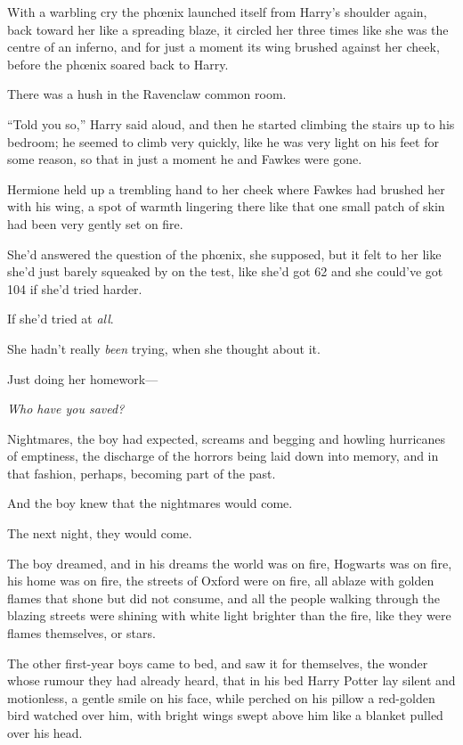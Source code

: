 With a warbling cry the phœnix launched itself from Harry’s shoulder again, back toward her like a spreading blaze, it circled her three times like she was the centre of an inferno, and for just a moment its wing brushed against her cheek, before the phœnix soared back to Harry.

There was a hush in the Ravenclaw common room.

“Told you so,” Harry said aloud, and then he started climbing the stairs up to his bedroom; he seemed to climb very quickly, like he was very light on his feet for some reason, so that in just a moment he and Fawkes were gone.

Hermione held up a trembling hand to her cheek where Fawkes had brushed her with his wing, a spot of warmth lingering there like that one small patch of skin had been very gently set on fire.

She’d answered the question of the phœnix, she supposed, but it felt to her like she’d just barely squeaked by on the test, like she’d got 62 and she could’ve got 104 if she’d tried harder.

If she’d tried at \emph{all}.

She hadn’t really \emph{been} trying, when she thought about it.

Just doing her homework—

\emph{Who have you saved?}


Nightmares, the boy had expected, screams and begging and howling hurricanes of emptiness, the discharge of the horrors being laid down into memory, and in that fashion, perhaps, becoming part of the past.

And the boy knew that the nightmares would come.

The next night, they would come.

The boy dreamed, and in his dreams the world was on fire, Hogwarts was on fire, his home was on fire, the streets of Oxford were on fire, all ablaze with golden flames that shone but did not consume, and all the people walking through the blazing streets were shining with white light brighter than the fire, like they were flames themselves, or stars.

The other first-year boys came to bed, and saw it for themselves, the wonder whose rumour they had already heard, that in his bed Harry Potter lay silent and motionless, a gentle smile on his face, while perched on his pillow a red-golden bird watched over him, with bright wings swept above him like a blanket pulled over his head.

